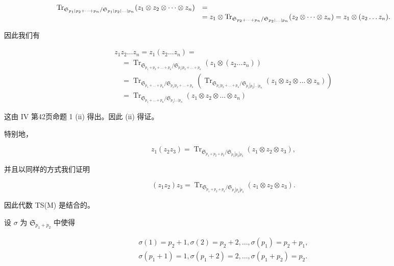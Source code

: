 \[
\begin{array}{r l} \operatorname{Tr} _ {\mathfrak {S} _ {p _ {1} | p _ {2} + \dots + p _ {n}} / \mathfrak {S} _ {p _ {1} | p _ {2} | \dots | p _ {n}}} (z _ {1} \otimes z _ {2} \otimes \dots \otimes z _ {n}) & = \\ & = z _ {1} \otimes \operatorname{Tr} _ {\mathfrak {S} _ {p _ {2} + \dots + p _ {n}} / \mathfrak {S} _ {p _ {2} | \dots | p _ {n}}} (z _ {2} \otimes \dots \otimes z _ {n}) = z _ {1} \otimes (z _ {2} \dots z _ {n}). \end{array}
\]

因此我们有

\[
\begin{array}{l} z _ {1} z _ {2} \dots z _ {n} = z _ {1} (z _ {2} \dots z _ {n}) = \\ \quad = \operatorname{Tr} _ {\mathfrak {S} _ {p _ {1} + p _ {2} + \dots + p _ {n}} / \mathfrak {S} _ {p _ {1} | p _ {2} + \dots + p _ {n}}} (z _ {1} \otimes (z _ {2} \dots z _ {n})) \\ \quad = \operatorname{Tr} _ {\mathfrak {S} _ {p _ {1} + \dots + p _ {n}} / \mathfrak {S} _ {p _ {1} | p _ {2} + \dots + p _ {n}}} (\operatorname{Tr} _ {\mathfrak {S} _ {p _ {1} | p _ {2} + \dots + p _ {n}} / \mathfrak {S} _ {p _ {1} | p _ {2} | \dots | p _ {n}}} (z _ {1} \otimes z _ {2} \otimes \dots \otimes z _ {n})) \\ \quad = \operatorname{Tr} _ {\mathfrak {S} _ {p _ {1} + \dots + p _ {n}} / \mathfrak {S} _ {p _ {1} | \dots | p _ {n}}} (z _ {1} \otimes z _ {2} \otimes \dots \otimes z _ {n}) \end{array}
\]

这由 IV 第42页命题 1 (ii) 得出。因此 (ii) 得证。

特别地，

\[
z _ {1} \left(z _ {2} z _ {3}\right) = \operatorname{Tr} _ {\mathfrak {S} _ {p _ {1} + p _ {2} + p _ {3}} / \mathfrak {S} _ {p _ {1} | p _ {2} | p _ {3}}} \left(z _ {1} \otimes z _ {2} \otimes z _ {3}\right),
\]

并且以同样的方式我们证明

\[
\left(z _ {1} z _ {2}\right) z _ {3} = \operatorname{Tr} _ {\mathfrak {S} _ {p _ {1} + p _ {2} + p _ {3}} / \mathfrak {S} _ {p _ {1} | p _ {2} | p _ {3}}} \left(z _ {1} \otimes z _ {2} \otimes z _ {3}\right).
\]

因此代数 TS(M) 是结合的。

设 \(\sigma\) 为 \(\mathfrak{S}_{p_1 + p_2}\) 中使得

\[
\begin{array}{l} \sigma (1) = p _ {2} + 1, \sigma (2) = p _ {2} + 2, \dots , \sigma (p _ {1}) = p _ {2} + p _ {1}, \\ \sigma (p _ {1} + 1) = 1, \sigma (p _ {1} + 2) = 2, \dots , \sigma (p _ {1} + p _ {2}) = p _ {2}. \end{array}
\]

